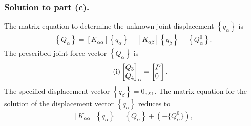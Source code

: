 \documentclass{AeroStructure-ERJohnson}
\begin{document}
\begin{example*}
\vspace*{-1pc}

\subsubsection{Solution to part (c).} The matrix equation to determine the unknown joint displacement $\left\{q_{\alpha}\right\}$ is
\begin{align}\label{eq16.7h}\tag{h}
\left\{Q_{\alpha}\right\}=\left[K_{\alpha \alpha}\right]\left\{q_{\alpha}\right\}+\left[K_{\alpha \beta}\right]\left\{q_{\beta}\right\}+\left\{Q_{\alpha}^{0}\right\}.
\end{align}
The prescribed joint force vector $\left\{Q_{\alpha}\right\}$ is
\begin{align}\label{eq16.7i}\tag{i}
\left[\begin{array}{@{}c@{}}Q_{3} \\Q_{4}\end{array}\right]_{\alpha}=\left[\begin{array}{@{}l@{}}P \\0\end{array}\right].
\end{align}
The specified displacement vector $\left\{q_{\beta}\right\}=0{ }_{5 X 1}$. The matrix equation for the solution of the displacement vector $\left\{q_{\alpha}\right\}$ reduces to\vspace*{-6pt}
\begin{align}\label{eq16.7j}\tag{j}
\left[K_{\alpha \alpha}\right]\left\{q_{\alpha}\right\}=\left\{Q_{\alpha}\right\}+(-\{Q_{\alpha}^{0}\}),
\end{align}


\vspace*{-1pc}


\end{example*}
\end{document}
